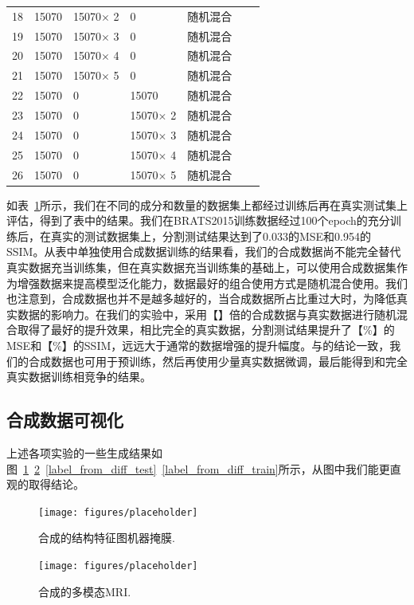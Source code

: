 \documentclass[letterpaper]{article} %
\begin{document}
\begin{table}[t]
{\begin{tabular}{l|l|l|l|l|l|l}
			18& 15070 & 15070$\times$ 2  &0 &随机混合 & & \\
			19& 15070 & 15070$\times$ 3  &0 &随机混合 & & \\
			20& 15070 & 15070$\times$ 4  &0 &随机混合 & & \\
			21& 15070 & 15070$\times$ 5  &0 &随机混合 & & \\
			
			22& 15070 &0 & 15070 &随机混合 & & \\
			23& 15070 &0 & 15070$\times$ 2 &随机混合 & & \\
			24& 15070 &0 & 15070$\times$ 3 &随机混合 & & \\
			25& 15070 &0 & 15070$\times$ 4 &随机混合 & & \\
			26& 15070 &0 & 15070$\times$ 5 &随机混合 & & \\
		\end{tabular}
	}
	\label{use_test}
\end{table}
如表~\ref{use_test}所示，我们在不同的成分和数量的数据集上都经过训练后再在真实测试集上评估，得到了表中的结果。我们在BRATS2015训练数据经过100个epoch的充分训练后，在真实的测试数据集上，分割测试结果达到了0.033的MSE和0.954的SSIM。从表中单独使用合成数据训练的结果看，我们的合成数据尚不能完全替代真实数据充当训练集，但在真实数据充当训练集的基础上，可以使用合成数据集作为增强数据来提高模型泛化能力，数据最好的组合使用方式是随机混合使用。我们也注意到，合成数据也并不是越多越好的，当合成数据所占比重过大时，为降低真实数据的影响力。在我们的实验中，采用【】倍的合成数据与真实数据进行随机混合取得了最好的提升效果，相比完全的真实数据，分割测试结果提升了【\%】的MSE和【\%】的SSIM，远远大于通常的数据增强的提升幅度。与\cite{4shin2018medical}的结论一致，我们的合成数据也可用于预训练，然后再使用少量真实数据微调，最后能得到和完全真实数据训练相竞争的结果。

\subsection{合成数据可视化}
上述各项实验的一些生成结果如图~\ref{generated_f}~\ref{generated_mri}~\ref{label_from_diff_test}~\ref{label_from_diff_train}所示，从图中我们能更直观的取得结论。
\begin{figure}
	\centering
	\texttt{[image: figures/placeholder]}
	\caption{合成的结构特征图机器掩膜.}
	\label{generated_f}
\end{figure}

\begin{figure}
	\centering
	\texttt{[image: figures/placeholder]}
	\caption{合成的多模态MRI.}
	\label{generated_mri}
\end{figure}
\end{document}
